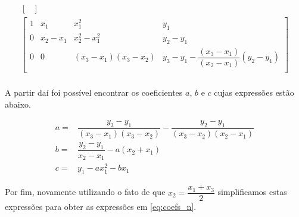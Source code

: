 \documentclass{article}
\begin{document}
\begin{gather*}
\begin{bmatrix}
\end{bmatrix} \\
\begin{bmatrix}
    1 & x_1       & x_1^2         & y_1 \\
    0 & x_2 - x_1 & x_2^2 - x_1^2 & y_2 - y_1\\
    0 & 0         & (x_3 - x_1) (x_3 - x_2) & y_3 - y_1 - \dfrac{(x_3 - x_1)}{(x_2 - x_1)}(y_2 - y_1)\\
\end{bmatrix} \\
\end{gather*}

A partir daí foi possível encontrar os coeficientes $a$, $b$ e $c$ cujas expressões estão abaixo.

\begin{equation}
\begin{split}
    a = &\dfrac{y_3 - y_1}{(x_3 - x_1)(x_3 - x_2)} - \dfrac{y_2 - y_1}{(x_3 - x_2)(x_2 - x_1)} \\
    b = &\dfrac{y_2 - y_1}{x_2 - x_1} - a(x_2 + x_1) \\
    c = & y_1 - ax_1^2 - b x_1
\end{split}
\end{equation}

Por fim, novamente utilizando o fato de que $x_2 = \dfrac{x_1 + x_3}{2}$ simplificamos estas expressões para obter as expressões em \ref{eq:coefs_n}.
\end{document}
